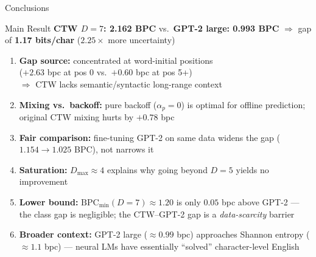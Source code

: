 \documentclass[aspectratio=169, 10pt]{beamer}
\begin{document}
\begin{frame}{Conclusions}

  \begin{block}{Main Result}
    \textbf{CTW $D=7$: 2.162 BPC} vs.\
    \textbf{GPT-2 large: 0.993 BPC} $\Rightarrow$
    gap of \textbf{1.17 bits/char} ($\mathbf{2.25\times}$ more uncertainty)
  \end{block}

  \bigskip
  \begin{enumerate}
    \item \textbf{Gap source:} concentrated at word-initial positions\\
          ($+2.63$ bpc at pos 0 vs.\ $+0.60$ bpc at pos 5+)\\
          $\Rightarrow$ CTW lacks semantic/syntactic long-range context

    \item \textbf{Mixing vs.\ backoff:} pure backoff ($\alpha_p=0$) is optimal for
          offline prediction; original CTW mixing hurts by $+0.78$ bpc

    \item \textbf{Fair comparison:} fine-tuning GPT-2 on same data
          widens the gap ($1.154 \to 1.025$ BPC), not narrows it

    \item \textbf{Saturation:} $D_{\max} \approx 4$ explains why
          going beyond $D=5$ yields no improvement

    \item \textbf{Lower bound:} $\mathrm{BPC}_{\min}(D{=}7) \approx 1.20$
          is only $0.05$ bpc above GPT-2 — the class gap is negligible;
          the CTW–GPT-2 gap is a \emph{data-scarcity} barrier

    \item \textbf{Broader context:} GPT-2 large ($\approx 0.99$ bpc)
          approaches Shannon entropy ($\approx 1.1$ bpc) —
          neural LMs have essentially ``solved'' character-level English
  \end{enumerate}
\end{frame}
\end{document}
